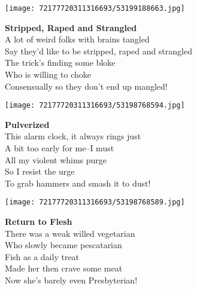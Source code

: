 \documentclass[10pt,letterpaper]{article}
\begin{document}
\begin{center}
\texttt{[image: 72177720311316693/53199188663.jpg]}
\end{center}

\begin{center}
\textbf{Stripped, Raped and Strangled}\\
\vskip 0.2in
A lot of weird folks with brains tangled\\
Say they'd like to be stripped, raped and strangled\\
The trick's finding some bloke\\
Who is willing to choke\\
Consensually so they don't end up mangled!\\
\end{center}
\pagebreak

\begin{center}\texttt{[image: 72177720311316693/53198768594.jpg]}
\end{center}
\begin{center}
\textbf{Pulverized}\\
\vskip 0.2in
This alarm clock, it always rings just\\
A bit too early for me--I must\\
All my violent whims purge\\
So I resist the urge\\
To grab hammers and smash it to dust!\\
\end{center}
\pagebreak

\begin{center}
\texttt{[image: 72177720311316693/53198768589.jpg]}
\end{center}

\begin{center}
\textbf{Return to Flesh}\\
\vskip 0.2in
There was a weak willed vegetarian\\
Who slowly became pescatarian\\
Fish as a daily treat\\
Made her then crave some meat\\
Now she's barely even Presbyterian!\\
\end{center}
\pagebreak
\end{document}
